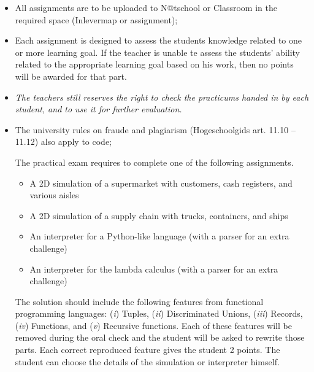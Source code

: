 \begin{itemize}
  \item All assignments are to be uploaded to N@tschool or Classroom in the required space (Inlevermap or assignment);
  \item Each assignment is designed to assess the students knowledge related to one or more learning goal.
          If the teacher is unable te assess the students' ability related to the appropriate learning goal based on his work, then no points will be awarded for that part.
  \item \textit{The teachers still reserves the right to check the practicums handed in by each student, and to use it for further evaluation.}
  \item The university rules on fraude and plagiarism (Hogeschoolgids art. 11.10 -- 11.12) also apply to code;
  
The practical exam requires to complete one of the following assignments.

\begin{itemize}
	\item A 2D simulation of a supermarket with customers, cash registers, and various aisles
	\item A 2D simulation of a supply chain with trucks, containers, and ships
	\item An interpreter for a Python-like language (with a parser for an extra challenge)
	\item An interpreter for the lambda calculus  (with a parser for an extra challenge)	
\end{itemize}

The solution should include the following features from functional programming languages: (\textit{i}) Tuples, (\textit{ii}) Discriminated Unions, 
(\textit{iii}) Records, (\textit{iv}) Functions, and (\textit{v}) Recursive functions. Each of these features will be removed during the oral check and the student 
will be asked to rewrite those parts. Each correct reproduced feature gives the student 2 points. The student can choose the details of the simulation or interpreter himself.

\end{itemize}
